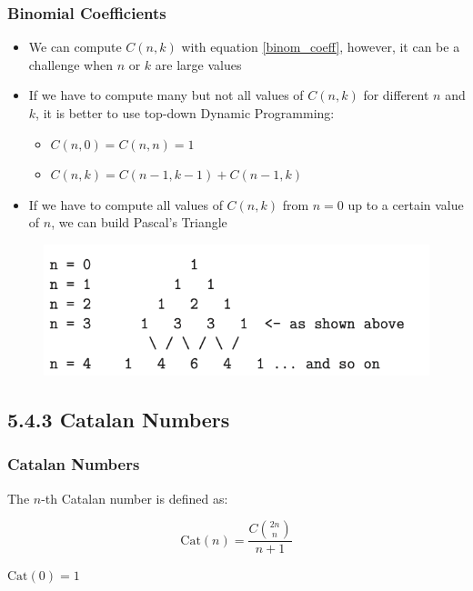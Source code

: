 \documentclass{beamer}
\begin{document}
\begin{frame}[fragile]
\frametitle{Binomial Coefficients}

\begin{itemize}
    \item We can compute $C(n,k)$ with equation \ref{binom_coeff}, however, it can be a challenge when $n$ or $k$ are large values
    \pause
    \item If we have to compute many but not all values of $C(n, k)$ for different $n$ and $k$, it is better to use top-down Dynamic Programming:
    	\begin{itemize}
		    \item $C(n,0) = C(n,n) = 1$
		    \item $C(n,k) = C(n-1, k-1) + C(n-1, k)$
		\end{itemize}
    \pause		
	\item If we have to compute all values of $C(n,k)$ from $n=0$ up to a certain value of $n$, we can build Pascal's Triangle 
\end{itemize}

\begin{figure}
    \centering
    \includegraphics[scale=0.5]{imgs/pascal_triangle.png}
\end{figure}

\end{frame}


\subsection{5.4.3 Catalan Numbers}

\begin{frame}[fragile]
\frametitle{Catalan Numbers}

The $n$-th Catalan number is defined as:

\begin{equation*}
    \text{Cat}(n) = \frac{C\binom{2n}{n}}{n+1}
\end{equation*}

$\text{Cat}(0) = 1$

\end{frame}
\end{document}
